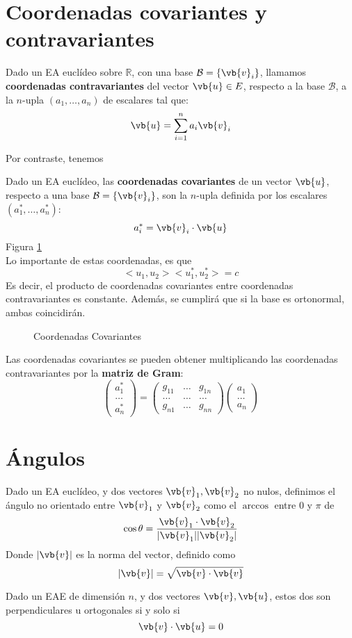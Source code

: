 \documentclass{./Geometria.tex}
\begin{document}
\section{Coordenadas covariantes y contravariantes}
\begin{defin}
	Dado un EA euclídeo sobre $\mathbb{R}$, con una base $\mathcal{B}= \{ \vb{v}_{i} \}$, llamamos \textbf{coordenadas contravariantes} del vector $\vb{u}\in E$, respecto a la base $\mathcal{B}$, a la $n$-upla $(a_1,\dots ,a_{n})$ de escalares tal que:
	\[
		\vb{u} = \sum^{n}_{i=1} a_{i} \vb{v}_{i}
	\]
\end{defin}
Por contraste, tenemos
\pagebreak
\begin{defin}
	Dado un EA euclídeo, las \textbf{coordenadas covariantes} de un vector $\vb{u}$, respecto a una base $\mathcal{B} = \{ \vb{v}_{i} \}$, son la $n$-upla definida por los escalares $(a^{*}_{1},\dots ,a^{*}_{n})$:
	\[
		a^{*}_{i} = \vb{v}_{i}\cdot \vb{u}
	\]
	Figura \ref{fig:coords-covariantes}\\
Lo importante de estas coordenadas, es que
\[
	<u_1,u_2><u_1^{*},u_2^{*}> = c
\]
Es decir, el producto de coordenadas covariantes entre coordenadas contravariantes es constante. Además, se cumplirá que si la base es ortonormal, ambas coincidirán.
\end{defin}
\begin{figure}[ht]
    \centering
    \caption{Coordenadas Covariantes}
    \label{fig:coords-covariantes}
\end{figure}
Las coordenadas covariantes se pueden obtener multiplicando las coordenadas contravariantes por la \textbf{matriz de Gram}:
\[
	\begin{pmatrix} a_1^{*}\\\dots \\ a_{n}^{*} \end{pmatrix}=
	\begin{pmatrix} g_{11} & \dots & g_{1n}\\
		\dots & \dots &\dots \\
		g_{n 1} & \dots & g_{nn}
	\end{pmatrix} \begin{pmatrix} a_1\\ \dots \\ a_{n} \end{pmatrix} 
\]
\pagebreak
\section{Ángulos}
\begin{defin}
	Dado un EA euclídeo, y dos vectores $\vb{v}_{1}, \vb{v}_{2}$ no nulos, definimos el ángulo no orientado entre $\vb{v}_{1}$ y $\vb{v}_{2}$ como el $\arccos$ entre $0$ y $\pi$ de
	\[
		\cos \theta = \frac{\vb{v}_{1}\cdot \vb{v}_{2}}{|\vb{v}_{1}||\vb{v}_{2}|}
	\]
	Donde $|\vb{v}|$ es la norma del vector, definido como
	\[
		|\vb{v}| = \sqrt{\vb{v}\cdot \vb{v}}
	\]
\end{defin}
\begin{defin}[Perpendicularidad]
	Dado un EAE de dimensión $n$, y dos vectores $\vb{v}, \vb{u}$, estos dos son perpendiculares u ortogonales si y solo si
	\[
		\vb{v}\cdot \vb{u} = 0
	\]
\end{defin}
\end{document}
